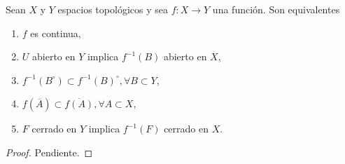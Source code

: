 

\begin{theorem}
Sean $X$ y $Y$ espacios topológicos y sea $f : X \longrightarrow Y$ una función. Son equivalentes
\begin{enumerate}[label=\textnormal{(\roman*)}, align=left, labelwidth=1.7em, leftmargin=3.0em]
\item $f$ es continua,
\item $U$ abierto en $Y$ implica $f^{-1}(B)$ abierto en $X$,
\item $f^{-1}(B^\circ) \subset f^{-1}(B)^\circ, \forall B \subset Y$,
\item $f(\overline{A}) \subset \overline{f(A)}, \forall A \subset X$,
\item $F$ cerrado en $Y$ implica $f^{-1}(F)$ cerrado en $X$. 
\end{enumerate}
\end{theorem}

\begin{proof}
Pendiente.
\end{proof}
